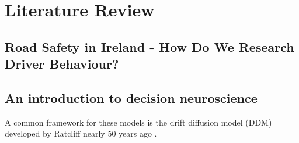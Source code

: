 \chapter{Literature Review}



\section{Road Safety in Ireland - How Do We Research Driver Behaviour?}


\section{An introduction to decision neuroscience}
A common framework for these models is the drift diffusion model (DDM) developed by Ratcliff nearly 50 years ago \cite{ratcliffTheoryMemoryRetrieval1978}.



